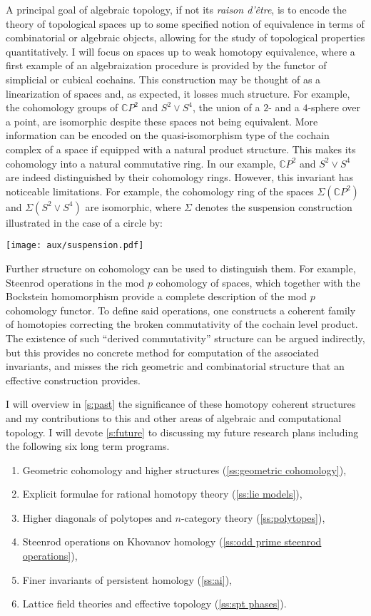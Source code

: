 A principal goal of algebraic topology, if not its \emph{raison d'\^{e}tre}, is to encode the theory of topological spaces up to some specified notion of equivalence in terms of combinatorial or algebraic objects, allowing for the study of topological properties quantitatively.
I will focus on spaces up to weak homotopy equivalence, where a first example of an algebraization procedure is provided by the functor of simplicial or cubical cochains.
This construction may be thought of as a linearization of spaces and, as expected, it losses much structure.
For example, the cohomology groups of $\mathbb{C} P^2$ and $S^2 \vee S^4$, the union of a $2$- and a $4$-sphere over a point, are isomorphic despite these spaces not being equivalent.
More information can be encoded on the quasi-isomorphism type of the cochain complex of a space if equipped with a natural product structure.
This makes its cohomology into a natural commutative ring.
In our example, $\mathbb{C} P^2$ and $S^2 \vee S^4$ are indeed distinguished by their cohomology rings.
However, this invariant has noticeable limitations.
For example, the cohomology ring of the spaces $\Sigma(\mathbb{C} P^2)$ and $\Sigma(S^2 \vee S^4)$ are isomorphic, where $\Sigma$ denotes the suspension construction illustrated in the case of a circle by:
\begin{center}
	\texttt{[image: aux/suspension.pdf]}
\end{center}
Further structure on cohomology can be used to distinguish them.
For example, Steenrod operations in the mod $p$ cohomology of spaces, which together with the Bockstein homomorphism provide a complete description of the mod $p$ cohomology functor.
To define said operations, one constructs a coherent family of homotopies correcting the broken commutativity of the cochain level product.
The existence of such ``derived commutativity'' structure can be argued indirectly, but this provides no concrete method for computation of the associated invariants, and misses the rich geometric and combinatorial structure that an effective construction provides.

I will overview in \cref{s:past} the significance of these homotopy coherent structures and my contributions to this and other areas of algebraic and computational topology.
I will devote \cref{s:future} to discussing my future research plans including the following six long term programs.

\begin{enumerate}
	\item Geometric cohomology and higher structures (\cref{ss:geometric cohomology}),
	\item Explicit formulae for rational homotopy theory (\cref{ss:lie models}),
	\item Higher diagonals of polytopes and $n$-category theory (\cref{ss:polytopes}),
	\item Steenrod operations on Khovanov homology (\cref{ss:odd prime steenrod operations}),
	\item Finer invariants of persistent homology (\cref{ss:ai}),
	\item Lattice field theories and effective topology (\cref{ss:spt phases}).
\end{enumerate}
